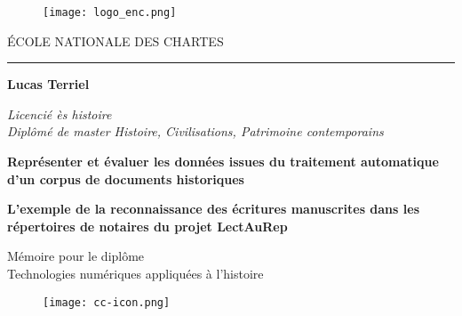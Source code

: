 \begin{titlepage}
    \begin{center}
    
\begin{figure}[h]
    \centering
    \centerline{\texttt{[image: logo\_enc.png]}}
\end{figure}

        \bigskip
    
        \begin{large}
            \'ECOLE NATIONALE DES CHARTES 
        \end{large}
    
        \begin{center}
            \rule{4cm}{0.02cm}
        \end{center}
    
        \hugeskip
        
        \begin{Large}
             \textbf{Lucas Terriel}\\
        \end{Large}
        \begin{normalsize}
            \textit{Licencié ès histoire}\\
            \textit{Diplômé de master 
            Histoire, Civilisations, Patrimoine contemporains}\\
        \end{normalsize}
        
        \hugeskip
        \bigskip
        
        \begin{LARGE}
            \textbf{Représenter et évaluer les données issues du traitement automatique d'un corpus de documents historiques}
            
        \end{LARGE}
        \bigskip
        \bigskip
        \bigskip
        \bigskip
        \begin{large}
            \textbf{L'exemple de la reconnaissance des écritures manuscrites dans les répertoires de notaires du projet LectAuRep}\\
        \end{large}
        
        \hugeskip
        \vfill
        
        
        
        \begin{large}
            Mémoire pour le diplôme\\
            \og Technologies numériques appliquées à l'histoire \fg\\
        \end{large}
        
        \begin{figure}[H]
            \centering
            \texttt{[image: cc-icon.png]}
            \label{traitement}
        \end{figure}
        
    \end{center}
\end{titlepage}

\thispagestyle{empty}
\cleardoublepage